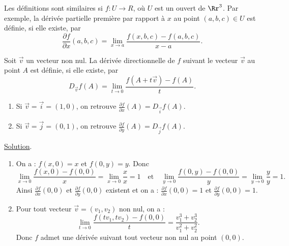 \documentclass[class=report,crop=false]{standalone}
\begin{document}
Les définitions sont similaires si $f:U\to R$, o\`u $U$ est un ouvert de $\Rr^3$. Par exemple, la dérivée partielle première par rapport à $x$ au point $(a,b,c)\in U$ est définie, si elle existe, par
$$\frac{\partial f}{\partial x}(a,b,c)=\lim _{x\to a}\frac{f(x,b,c)-f(a,b,c)}{x-a}.$$

\vskip6mm

\begin{definition}Soit $\vec{v}$ un vecteur non nul. La dérivée directionnelle de $f$ suivant le vecteur $\vec{v}$ au point $A$ est définie, si elle existe, par
$$D_{\vec{v}}f(A)=\lim _{t\to 0}\frac{f(A+t\vec{v})-f(A)}{t}.$$
\end{definition}

\vskip4mm

\begin{enumerate}
\item Si $\vec{v}=\vec{i}=(1,0)$, on retrouve $\displaystyle \frac{\partial f}{\partial x}(A)=D_{\vec{i}}f(A)$.
\item Si $\vec{v}=\vec{j}=(0,1)$, on retrouve $\displaystyle \frac{\partial f}{\partial y}(A)=D_{\vec{j}}f(A)$.
\end{enumerate}

\vskip6mm


\vskip4mm

\noindent \underline{Solution}. \begin{enumerate}
\item On a : $f(x,0)=x$ et $f(0,y)=y$. Donc
$$\lim _{x\to 0}\frac{f(x,0)-f(0,0)}{x}=\lim _{x\to 0}\frac{x}{x}=1\quad \mbox{et}\quad \lim _{y\to 0}\frac{f(0,y)-f(0,0)}{y}=\lim _{y\to 0}\frac{y}{y}=1.$$
Ainsi $\displaystyle \frac{\partial f}{\partial x}(0,0)$ et $\displaystyle \frac{\partial f}{\partial y}(0,0)$ existent et on a : $\displaystyle \frac{\partial f}{\partial x}(0,0)=1$ et $\displaystyle \frac{\partial f}{\partial y}(0,0)=1$.
\item Pour tout vecteur $\vec{v}=(v_1,v_2)$ non nul, on a :
$$\lim _{t\to 0}\frac{f(tv_1,tv_2)-f(0,0)}{t}=\frac{v_1^3+v_2^3}{v_1^2+v_2^2}.$$
Donc $f$ admet une dérivée suivant tout vecteur non nul au point $(0,0)$.
\end{enumerate}
\end{document}
